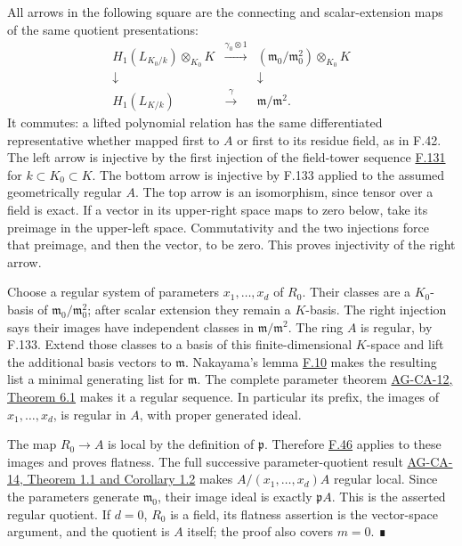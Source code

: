 \documentclass[11pt,a4paper,openany]{report}
\begin{document}
All arrows in the following square are the connecting and scalar-extension maps of the same quotient presentations: \[\begin{array}{ccc}
H_1(L_{K_0/k})\otimes_{K_0}K&\xrightarrow{\gamma_0\otimes1}&
(\mathfrak m_0/\mathfrak m_0^2)\otimes_{K_0}K\\
\downarrow&&\downarrow\\
H_1(L_{K/k})&\xrightarrow{\gamma}&\mathfrak m/\mathfrak m^2.
\end{array}\] It commutes: a lifted polynomial relation has the same differentiated representative whether mapped first to \(A\) or first to its residue field, as in F.42. The left arrow is injective by the first injection of the field-tower sequence \hyperref[AG-RG-S05-more-algebra-lemma-transitivity-gamma]{F.131} for \(k\subset K_0\subset K\). The bottom arrow is injective by F.133 applied to the assumed geometrically regular \(A\). The top arrow is an isomorphism, since tensor over a field is exact. If a vector in its upper-right space maps to zero below, take its preimage in the upper-left space. Commutativity and the two injections force that preimage, and then the vector, to be zero. This proves injectivity of the right arrow.

Choose a regular system of parameters \(x_1,\ldots,x_d\) of \(R_0\). Their classes are a \(K_0\)-basis of \(\mathfrak m_0/\mathfrak m_0^2\); after scalar extension they remain a \(K\)-basis. The right injection says their images have independent classes in \(\mathfrak m/\mathfrak m^2\). The ring \(A\) is regular, by F.133. Extend those classes to a basis of this finite-dimensional \(K\)-space and lift the additional basis vectors to \(\mathfrak m\). Nakayama's lemma \hyperref[AG-RG-S05-algebra-lemma-NAK]{F.10} makes the resulting list a minimal generating list for \(\mathfrak m\). The complete parameter theorem \href{https://github.com/KokunoYumeto/open-math-courses/blob/d02d0a3669f42579db037cd44de1d113fdd770a1/docs/courses/AG-CA/src/regular-sequences-depth-and-cohen-macaulay-modules.md}{AG-CA-12, Theorem 6.1} makes it a regular sequence. In particular its prefix, the images of \(x_1,\ldots,x_d\), is regular in \(A\), with proper generated ideal.

The map \(R_0\to A\) is local by the definition of \(\mathfrak p\). Therefore \hyperref[AG-RG-S05-algebra-lemma-flat-over-regular]{F.46} applies to these images and proves flatness. The full successive parameter-quotient result \href{https://github.com/KokunoYumeto/open-math-courses/blob/d02d0a3669f42579db037cd44de1d113fdd770a1/docs/courses/AG-CA/src/regular-local-rings.md}{AG-CA-14, Theorem 1.1 and Corollary 1.2} makes \(A/(x_1,\ldots,x_d)A\) regular local. Since the parameters generate \(\mathfrak m_0\), their image ideal is exactly \(\mathfrak pA\). This is the asserted regular quotient. If \(d=0\), \(R_0\) is a field, its flatness assertion is the vector-space argument, and the quotient is \(A\) itself; the proof also covers \(m=0\). ∎
\end{document}
